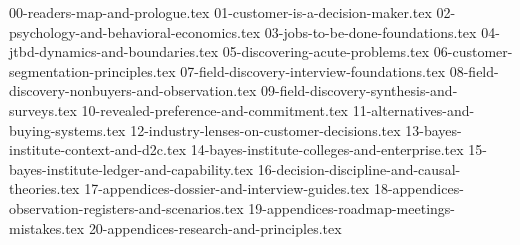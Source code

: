 
{00-readers-map-and-prologue.tex}
{01-customer-is-a-decision-maker.tex}
{02-psychology-and-behavioral-economics.tex}
{03-jobs-to-be-done-foundations.tex}
{04-jtbd-dynamics-and-boundaries.tex}
{05-discovering-acute-problems.tex}
{06-customer-segmentation-principles.tex}
{07-field-discovery-interview-foundations.tex}
{08-field-discovery-nonbuyers-and-observation.tex}
{09-field-discovery-synthesis-and-surveys.tex}
{10-revealed-preference-and-commitment.tex}
{11-alternatives-and-buying-systems.tex}
{12-industry-lenses-on-customer-decisions.tex}
{13-bayes-institute-context-and-d2c.tex}
{14-bayes-institute-colleges-and-enterprise.tex}
{15-bayes-institute-ledger-and-capability.tex}
{16-decision-discipline-and-causal-theories.tex}
{17-appendices-dossier-and-interview-guides.tex}
{18-appendices-observation-registers-and-scenarios.tex}
{19-appendices-roadmap-meetings-mistakes.tex}
{20-appendices-research-and-principles.tex}

